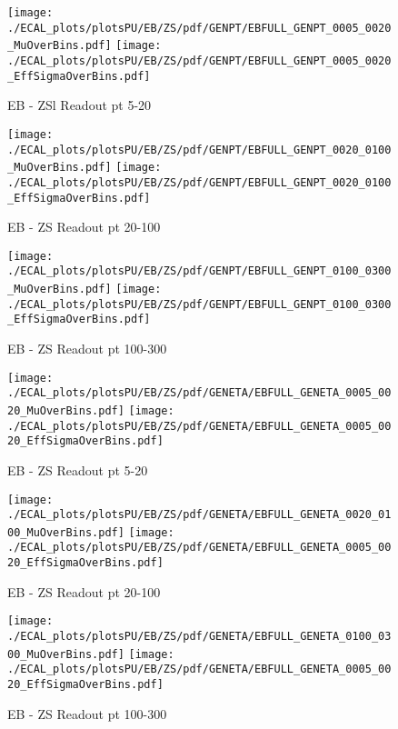 \begin{figure}
\texttt{[image: ./ECAL\_plots/plotsPU/EB/ZS/pdf/GENPT/EBFULL\_GENPT\_0005\_0020\_MuOverBins.pdf]}
\texttt{[image: ./ECAL\_plots/plotsPU/EB/ZS/pdf/GENPT/EBFULL\_GENPT\_0005\_0020\_EffSigmaOverBins.pdf]}
\caption{EB - ZSl Readout pt 5-20}
\end{figure}

\begin{figure}
\texttt{[image: ./ECAL\_plots/plotsPU/EB/ZS/pdf/GENPT/EBFULL\_GENPT\_0020\_0100\_MuOverBins.pdf]}
\texttt{[image: ./ECAL\_plots/plotsPU/EB/ZS/pdf/GENPT/EBFULL\_GENPT\_0020\_0100\_EffSigmaOverBins.pdf]}
\caption{EB - ZS Readout pt 20-100}
\end{figure}

\begin{figure}
\texttt{[image: ./ECAL\_plots/plotsPU/EB/ZS/pdf/GENPT/EBFULL\_GENPT\_0100\_0300\_MuOverBins.pdf]}
\texttt{[image: ./ECAL\_plots/plotsPU/EB/ZS/pdf/GENPT/EBFULL\_GENPT\_0100\_0300\_EffSigmaOverBins.pdf]}
\caption{EB - ZS Readout pt 100-300}
\end{figure}

\begin{figure}
\texttt{[image: ./ECAL\_plots/plotsPU/EB/ZS/pdf/GENETA/EBFULL\_GENETA\_0005\_0020\_MuOverBins.pdf]}
\texttt{[image: ./ECAL\_plots/plotsPU/EB/ZS/pdf/GENETA/EBFULL\_GENETA\_0005\_0020\_EffSigmaOverBins.pdf]}
\caption{EB - ZS Readout pt 5-20}
\end{figure}

\begin{figure}
\texttt{[image: ./ECAL\_plots/plotsPU/EB/ZS/pdf/GENETA/EBFULL\_GENETA\_0020\_0100\_MuOverBins.pdf]}
\texttt{[image: ./ECAL\_plots/plotsPU/EB/ZS/pdf/GENETA/EBFULL\_GENETA\_0005\_0020\_EffSigmaOverBins.pdf]}
\caption{EB - ZS Readout pt 20-100}
\end{figure}

\begin{figure}
\texttt{[image: ./ECAL\_plots/plotsPU/EB/ZS/pdf/GENETA/EBFULL\_GENETA\_0100\_0300\_MuOverBins.pdf]}
\texttt{[image: ./ECAL\_plots/plotsPU/EB/ZS/pdf/GENETA/EBFULL\_GENETA\_0005\_0020\_EffSigmaOverBins.pdf]}
\caption{EB - ZS  Readout pt 100-300}
\end{figure}


